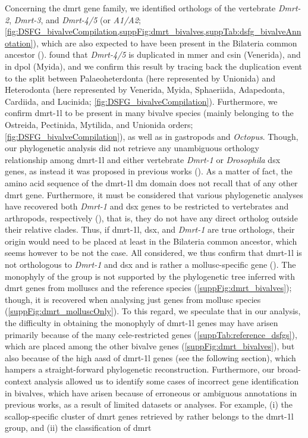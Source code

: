 Concerning the \gls{dmrt} gene family, we identified orthologs of the vertebrate \textit{Dmrt-2}, \textit{Dmrt-3}, and \textit{Dmrt-4/5} (or \textit{A1/A2}; \cref{fig:DSFG_bivalveCompilation,suppFig:dmrt_bivalves,suppTab:dsfg_bivalveAnnotation}), which are also expected to have been present in the Bilateria common ancestor ().  found that \textit{Dmrt-4/5} is duplicated in \gls{mmer} and \gls{csin} (Venerida), and in \gls{dpol} (Myida), and we confirm this result by tracing back the duplication event to the split between Palaeoheterdonta (here represented by Unionida) and Heterodonta (here represented by Venerida, Myida, Sphaeriida, Adapedonta, Cardiida, and Lucinida; \cref{fig:DSFG_bivalveCompilation}). Furthermore, we confirm \gls{dmrt-1l} to be present in many bivalve species (mainly belonging to the Ostreida, Pectinida, Mytilida, and Unionida orders; \cref{fig:DSFG_bivalveCompilation}), as well as in gastropods and \textit{Octopus}. Though, our phylogenetic analysis did not retrieve any unambiguous orthology relationship among \gls{dmrt-1l} and either vertebrate \textit{Dmrt-1} or \textit{Drosophila} \gls{dsx} genes, as instead it was proposed in previous works (). As a matter of fact, the amino acid sequence of the \gls{dmrt-1l} \gls{dm} domain does not recall that of any other \gls{dmrt} gene. Furthermore, it must be considered that various phylogenetic analyses have recovered both \textit{Dmrt-1} and \gls{dsx} genes to be restricted to vertebrates and arthropods, respectively (), that is, they do not have any direct ortholog outside their relative clades. Thus, if \gls{dmrt-1l}, \gls{dsx}, and \textit{Dmrt-1} are true orthologs, their origin would need to be placed at least in the Bilateria common ancestor, which seems however to be not the case. All considered, we thus confirm that \gls{dmrt-1l} is not orthologous to \textit{Dmrt-1} and \gls{dsx} and is rather a mollusc-specific gene (). The monophyly of the group is not supported by the phylogenetic tree inferred with \gls{dmrt} genes from molluscs and the reference species (\cref{suppFig:dmrt_bivalves}); though, it is recovered when analysing just genes from mollusc species (\cref{suppFig:dmrt_molluscOnly}). To this regard, we speculate that in our analysis, the difficulty in obtaining the monophyly of \gls{dmrt-1l} genes may have arisen primarily because of the many \gls{cele}-restricted genes (\cref{suppTab:reference_dsfgs}), which are placed among the other bivalve genes (\cref{suppFig:dmrt_bivalves}), but also because of the high \gls{aasd} of \gls{dmrt-1l} genes (see the following section), which hampers a straight-forward phylogenetic reconstruction. Furthermore, our broad-context analysis allowed us to identify some cases of incorrect gene identification in bivalves, which have arisen because of erroneous or ambiguous annotations in previous works, as a result of limited datasets or analyses. For example, (i) the scallop-specific cluster of \gls{dmrt} genes retrieved by  rather belongs to the \gls{dmrt-1l} group, and (ii) the classification of \gls{dmrt} 